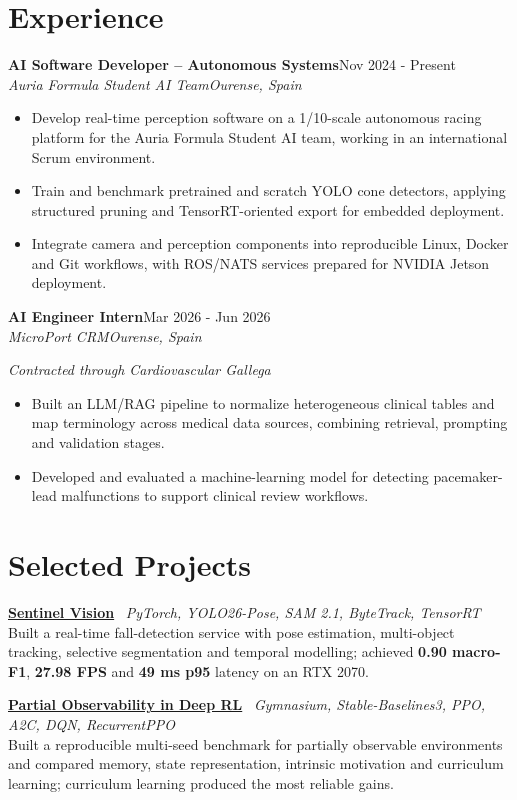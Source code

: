 \documentclass[10pt,a4paper]{article}
\newcommand{\entry}[4]{
  \textbf{#1}\hfill{\small #2}\\[-1pt]
  \textit{#3}\hfill{\small\textit{#4}}\par\vspace{-1.5pt}
}
\newcommand{\project}[3]{
  \textbf{#1} \textbar\ {\small\color{muted}\textit{#2}}\\[-1.5pt]
  #3\par\vspace{2pt}
}
\begin{document}
\section{Experience}
\entry{AI Software Developer -- Autonomous Systems}{Nov 2024 - Present}{Auria Formula Student AI Team}{Ourense, Spain}
\begin{itemize}
  \item Develop real-time perception software on a 1/10-scale autonomous racing platform for the Auria Formula Student AI team, working in an international Scrum environment.
  \item Train and benchmark pretrained and scratch YOLO cone detectors, applying structured pruning and TensorRT-oriented export for embedded deployment.
  \item Integrate camera and perception components into reproducible Linux, Docker and Git workflows, with ROS/NATS services prepared for NVIDIA Jetson deployment.
\end{itemize}

\entry{AI Engineer Intern}{Mar 2026 - Jun 2026}{MicroPort CRM}{Ourense, Spain}
{\small\color{muted}\textit{Contracted through Cardiovascular Gallega}}\par\vspace{-1.5pt}
\begin{itemize}
  \item Built an LLM/RAG pipeline to normalize heterogeneous clinical tables and map terminology across medical data sources, combining retrieval, prompting and validation stages.
  \item Developed and evaluated a machine-learning model for detecting pacemaker-lead malfunctions to support clinical review workflows.
\end{itemize}

\section{Selected Projects}
\project{\href{https://lucasfiz.dev/en/projects/sentinel-vision}{Sentinel Vision}}{PyTorch, YOLO26-Pose, SAM 2.1, ByteTrack, TensorRT}{Built a real-time fall-detection service with pose estimation, multi-object tracking, selective segmentation and temporal modelling; achieved \textbf{0.90 macro-F1}, \textbf{27.98 FPS} and \textbf{49 ms p95} latency on an RTX 2070.}

\project{\href{https://lucasfiz.dev/en/projects/minigrid-tfg}{Partial Observability in Deep RL}}{Gymnasium, Stable-Baselines3, PPO, A2C, DQN, RecurrentPPO}{Built a reproducible multi-seed benchmark for partially observable environments and compared memory, state representation, intrinsic motivation and curriculum learning; curriculum learning produced the most reliable gains.}
\end{document}
